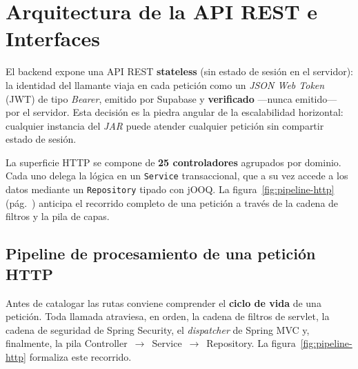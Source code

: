 \section{Arquitectura de la API REST e Interfaces}
\label{sec:api_rest}

El backend expone una API REST \textbf{stateless} (sin estado de sesión en el servidor):
la identidad del llamante viaja en cada petición como un \textit{JSON Web Token} (JWT)
de tipo \textit{Bearer}, emitido por Supabase y \textbf{verificado} —nunca emitido— por
el servidor. Esta decisión es la piedra angular de la escalabilidad horizontal: cualquier
instancia del \textit{JAR} puede atender cualquier petición sin compartir estado de sesión.

La superficie HTTP se compone de \textbf{25 controladores} agrupados por dominio. Cada
uno delega la lógica en un \texttt{Service} transaccional, que a su vez accede a los datos
mediante un \texttt{Repository} tipado con jOOQ. La figura~\ref{fig:pipeline-http}
(pág.~\pageref{fig:pipeline-http}) anticipa el recorrido completo de una petición a través
de la cadena de filtros y la pila de capas.

\subsection{Pipeline de procesamiento de una petición HTTP}
\label{subsec:pipeline}

Antes de catalogar las rutas conviene comprender el \textbf{ciclo de vida} de una
petición. Toda llamada atraviesa, en orden, la cadena de filtros de servlet, la cadena
de seguridad de Spring Security, el \textit{dispatcher} de Spring MVC y, finalmente, la
pila Controller~$\rightarrow$~Service~$\rightarrow$~Repository. La
figura~\ref{fig:pipeline-http} formaliza este recorrido.

